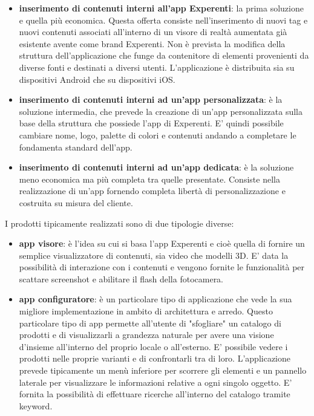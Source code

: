 \begin{itemize}
	\item \textbf{inserimento di contenuti interni all'app Experenti}: la prima soluzione e quella pi\`u economica. Questa offerta consiste nell'inserimento di nuovi tag e nuovi contenuti associati all'interno di un visore di realt\`a aumentata gi\`a esistente avente come brand Experenti. Non \`e prevista la modifica della struttura dell'applicazione che funge da contenitore di elementi provenienti da diverse fonti e destinati a diversi utenti. L'applicazione \`e distribuita sia su dispositivi Android che su dispositivi iOS.
	
	\item \textbf{inserimento di contenuti interni ad un'app personalizzata}: \`e la soluzione intermedia, che prevede la creazione di un'app personalizzata sulla base della struttura che possiede l'app di Experenti. E' quindi possibile cambiare nome, logo, palette di colori e contenuti andando a completare le fondamenta standard dell'app.
	
	\item \textbf{inserimento di contenuti interni ad un'app dedicata}: \`e la soluzione meno economica ma pi\`u completa tra quelle presentate. Consiste nella realizzazione di un'app fornendo completa libert\`a di personalizzazione e costruita su misura del cliente.
\end{itemize}

I prodotti tipicamente realizzati sono di due tipologie diverse:
\begin{itemize}
	\item \textbf{app visore}: \`e l'idea su cui si basa l'app Experenti e cio\`e quella di fornire un semplice visualizzatore di contenuti, sia video che modelli 3D. E' data la possibilit\`a di interazione con i contenuti e vengono fornite le funzionalit\`a per scattare screenshot e abilitare il flash della fotocamera.
	
	\item \textbf{app configuratore}: \`e un particolare tipo di applicazione che vede la sua migliore implementazione in ambito di architettura e arredo. Questo particolare tipo di app permette all'utente di "sfogliare" un catalogo di prodotti e di visualizzarli a grandezza naturale per avere una visione d'insieme all'interno del proprio locale o all'esterno. E' possibile vedere i prodotti nelle proprie varianti e di confrontarli tra di loro. L'applicazione prevede tipicamente un men\`u inferiore per scorrere gli elementi e un pannello laterale per visualizzare le informazioni relative a ogni singolo oggetto. E' fornita la possibilit\`a di effettuare ricerche all'interno del catalogo tramite keyword.
\end{itemize}

